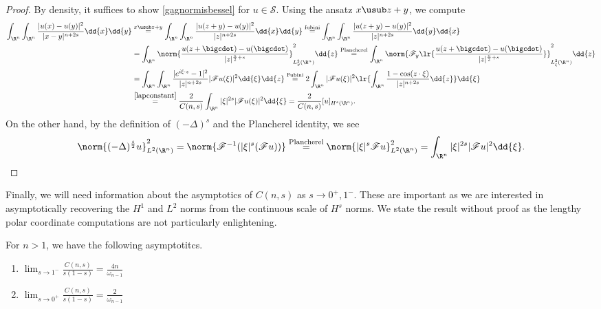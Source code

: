 \documentclass[../main.tex]{subfiles}
\begin{document}
\begin{proof}
    By density, it suffices to show \ref{gagnormisbessel} for $ u\in \mathscr{S} $. Using the ansatz $ x\usub z+y $, we compute
    \begin{align*}
        \int_{\R^{n}}\int_{\R^{n}} \frac{|u(x)-u(y)|^{2}}{|x-y|^{n+2s}}\dd{x}\dd{y} &\overset{x\usub z+y}{=} \int_{\R^{n}}\int_{\R^{n}} \frac{|u(z+y)-u(y)|^{2}}{|z|^{n+2s}}\dd{x}\dd{y} \overset{\text{fubini}}{=}\int_{\R^{n}}\int_{\R^{n}} \frac{|u(z+y)-u(y)|^{2}}{|z|^{n+2s}}\dd{y}\dd{x} \\
        &=\int_{\R^{n}} \norm{\frac{u(z+\bigcdot)-u(\bigcdot)}{|z|^{\frac{n}{2}+s}}}_{L^{2}_{y}(\R^{n})}^{2} \dd{z}\overset{\text{Plancherel}}{=} \int_{\R^{n}} \norm{\mathscr{F}_{y}\lr{\frac{u(z+\bigcdot)-u(\bigcdot)}{|z|^{\frac{n}{2}+s}}}}_{L^{2}_{\xi}(\R^{n})}^{2}\dd{z} \\
        &=\int_{\R^{n}} \int_{\R^{n}} \frac{|e^{i \xi\cdot z}-1|^{2}}{|z|^{n+2s}}|\mathscr{F}u( \xi)|^{2} \dd{\xi} \dd{z}   \overset{\text{Fubini}}{=}2\int_{\R^{n}} |\mathscr{F}u( \xi)|^{2} \lr{\int_{\R^{n}} \frac{1-\cos(z\cdot \xi) }{|z|^{n+2s}} \dd{z}}  \dd{\xi} \\
        &\overset{\ref{lapconstant}}{=} \frac{2}{C(n,s)}\int_{\R^{n}}| \xi|^{2s} |\mathscr{F}u( \xi)|^{2}   \dd{\xi} = \frac{2}{C(n,s)}[u]_{H^{s}(\R^{n})}.
    \end{align*}
    On the other hand, by the definition of $ (-\Delta )^{s} $ and the Plancherel identity, we see
    \[
        \norm{(-\Delta )^{\frac{s}{2}}u}_{L^{2}(\R^{n})}^{2} = \norm{\mathscr{F}^{-1} (| \xi|^{s}( \mathscr{F}u))} \overset{\text{Plancherel}}{=}\norm{| \xi|^{s} \mathscr{F}u}_{L^{2}(\R^{n})}^{2} = \int_{\R^{n}}| \xi|^{2s}|\mathscr{F}u|^{2}\dd{\xi}.
    \]
\end{proof}

Finally, we will need information about the asymptotics of $ C(n,s) $ as $ s\to0^+,1^- $. These are important as we are interested in asymptotically recovering the $ H^{1} $ and $ L^2 $ norms from the continuous scale of $ H^{s} $ norms. We state the result without proof as the lengthy polar coordinate computations are not particularly enlightening. \\

\begin{proposition}\label{constantasymp}
    For $ n>1 $, we have the following asymptotitcs.
    \begin{enumerate}
        \item $\displaystyle\lim_{s\to 1^{-}}\frac{C(n,s)}{s(1-s)} = \frac{4n}{\omega_{n-1}}$
        \item $\displaystyle\lim_{s\to 0^{+}}\frac{C(n,s)}{s(1-s)} = \frac{2}{\omega_{n-1}}$
    \end{enumerate}
        
\end{proposition}
\end{document}
